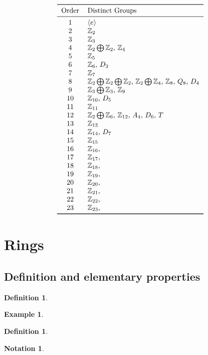 \documentclass[leqno,DIV=calc,paper=a4,fontsize=11pt]{article}
\theoremstyle{definition}
\newtheorem{defn}[thm]{Definition}
\newtheorem{exmp}[thm]{Example}
\newtheorem{notn}[thm]{Notation}
\theoremstyle{plain}
\theoremstyle{remark}
\begin{document}
\[
\begin{tabular}{clc}
\toprule
Order &   Distinct Groups     \\  \midrule
1     &   $\langle e\rangle$    \\
2     &   $\Bbb Z_2$   \\
3     &   $\Bbb Z_3$    \\
4     &   $\Bbb Z_2\bigoplus\Bbb Z_2$, $\Bbb Z_4$   \\
5     &   $\Bbb Z_5$    \\
6     &   $\Bbb Z_6$, $D_3$   \\
7     &   $\Bbb Z_7$    \\
8     &   $\Bbb Z_2\bigoplus\Bbb Z_2\bigoplus\Bbb Z_2$, $\Bbb Z_2\bigoplus\Bbb Z_4$, $\Bbb Z_8$, $Q_8$, $D_4$   \\
9     &   $\Bbb Z_3\bigoplus\Bbb Z_3$, $\Bbb Z_9$    \\
10    &   $\Bbb Z_{10}$, $D_5$   \\
11    &   $\Bbb Z_{11}$    \\
12    &   $\Bbb Z_2\bigoplus\Bbb Z_6$, $\Bbb Z_{12}$, $A_4$, $D_6$, $T$   \\
13    &   $\Bbb Z_{13}$    \\
14    &   $\Bbb Z_{14}$, $D_7$   \\
15    &   $\Bbb Z_{15}$   \\
16    &   $\Bbb Z_{16}$,    \\
17    &   $\Bbb Z_{17}$,   \\
18    &   $\Bbb Z_{18}$,    \\
19    &   $\Bbb Z_{19}$,   \\
20    &   $\Bbb Z_{20}$,   \\
21    &   $\Bbb Z_{21}$,    \\
22    &   $\Bbb Z_{22}$,   \\
23    &   $\Bbb Z_{23}$,    \\ \bottomrule
\end{tabular}
\]
\newpage
\section{Rings}

\subsection{Definition and elementary properties}
\begin{defn}

\end{defn}

\begin{exmp}

\end{exmp}
\begin{defn}

\end{defn}
\begin{notn}

\end{notn}
\end{document}
